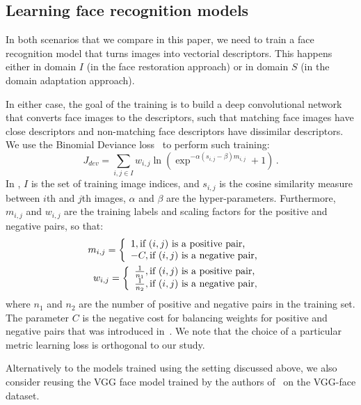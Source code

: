 \subsection{Learning face recognition models}
\label{sect:face_recognition}

In both scenarios that we compare in this paper, we need to train a face recognition model that turns images into vectorial descriptors. This happens either in domain $I$ (in the face restoration approach) or in domain $S$ (in the domain adaptation approach).

In either case, the goal of the training is to build a deep convolutional network that converts face images to the descriptors, such that matching face images have close descriptors and non-matching face descriptors have dissimilar descriptors. We use the Binomial Deviance loss~\cite{Yi14} to perform such training:
\begin{equation}
\label{eq:bindev}
J_{dev} = \sum_{i,j \in I} w_{i,j} \ln (\exp^{-\alpha (s_{i,j}-\beta) m_{i,j}} +1 )\,. 
\end{equation}
In , $I$ is the set of training image indices, and $s_{i,j}$ is the cosine similarity measure between $i$th and $j$th images, $\alpha$ and $\beta$ are the hyper-parameters. Furthermore,
$m_{i,j}$ and $w_{i, j}$ are the training labels and scaling factors for the positive and negative pairs, so that:
\begin{align}
    \label{eq:bindev_weights}
    m_{i, j} = \left\{
	\begin{array}{l l}
		1,  \text{if $(i,j)$ is a positive pair,} & \\ 
	   -C,  \text{if $(i,j)$ is a negative pair,} &
	\end{array}\right.
	\\
     w_{i, j}= \left\{
	\begin{array}{l l}
		\frac {1}{n_1},  \text{if $(i,j)$ is a positive pair,} &\\
		\frac {1}{n_2},  \text{if $(i,j)$ is a negative pair,} &
	\end{array}\right.
\end{align}	
where $n_1$ and $n_2$ are the number of positive and negative pairs in the training set. The parameter $C$ is the negative cost for balancing weights for positive and negative pairs that was introduced in~\cite{Yi14}. We note that the choice of a particular metric learning loss is orthogonal to our study.

Alternatively to the models trained using the setting discussed above, we also consider reusing the VGG face model trained by the authors of~\cite{parkhi2015deep} on the VGG-face dataset.